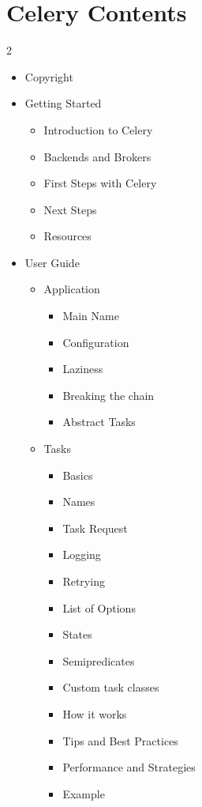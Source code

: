 \documentclass [8pt] {extarticle}
\begin{document}
    \section {Celery Contents}

    \begin {multicols} {2}

    \begin {itemize}
\item Copyright

\item Getting Started
    \begin {itemize}

\item Introduction to Celery

    \item Backends and Brokers
    \item First Steps with Celery
    \item Next Steps
    \item Resources
    \end {itemize}
    \item User Guide
        \begin {itemize}

\item Application

    \begin {itemize}
        \item Main Name
        \item Configuration
        \item Laziness
        \item Breaking the chain
        \item Abstract Tasks
    \end {itemize}

\item Tasks

    \begin {itemize}
        \item Basics
        \item Names
        \item Task Request
        \item Logging
        \item Retrying
        \item List of Options
        \item States
        \item Semipredicates
        \item Custom task classes
        \item How it works
        \item Tips and Best Practices
        \item Performance and Strategies
        \item Example
    \end {itemize}


\end{itemize}
\end{itemize}
\end{multicols}
\end{document}
